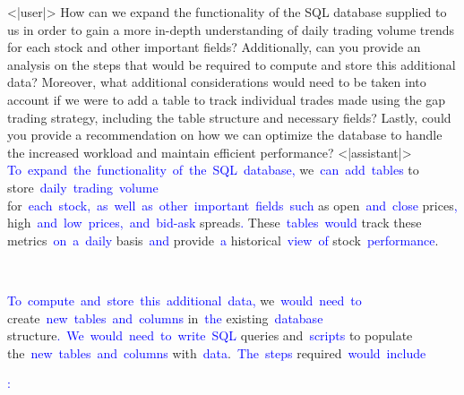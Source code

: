 \documentclass{article}
\begin{document}
\begin{tcolorbox}[colframe=black,colback=white]
<|user|>
How can we expand the functionality of the SQL database supplied to us in order to gain a more in-depth understanding of daily trading volume trends for each stock and other important fields? Additionally, can you provide an analysis on the steps that would be required to compute and store this additional data? Moreover, what additional considerations would need to be taken into account if we were to add a table to track individual trades made using the gap trading strategy, including the table structure and necessary fields? Lastly, could you provide a recommendation on how we can optimize the database to handle the increased workload and maintain efficient performance?
<|assistant|>
\textcolor{blue}{To}\textcolor{blue}{~expand}\textcolor{blue}{~the}\textcolor{blue}{~functionality}\textcolor{blue}{~of}\textcolor{blue}{~the}\textcolor{blue}{~SQL}\textcolor{blue}{~database}\textcolor{blue}{,} we\textcolor{blue}{~can}\textcolor{blue}{~add}\textcolor{blue}{~tables} to store\textcolor{blue}{~daily}\textcolor{blue}{~trading}\textcolor{blue}{~volume} for\textcolor{blue}{~each}\textcolor{blue}{~stock}\textcolor{blue}{,}\textcolor{blue}{~as}\textcolor{blue}{~well}\textcolor{blue}{~as}\textcolor{blue}{~other}\textcolor{blue}{~important}\textcolor{blue}{~fields}\textcolor{blue}{~such} as open\textcolor{blue}{~and}\textcolor{blue}{~close} prices\textcolor{blue}{,} high\textcolor{blue}{~and}\textcolor{blue}{~low}\textcolor{blue}{~prices}\textcolor{blue}{,}\textcolor{blue}{~and}\textcolor{blue}{~bid}\textcolor{blue}{-}\textcolor{blue}{ask} spreads\textcolor{blue}{.} These\textcolor{blue}{~tables}\textcolor{blue}{~would} track these metrics\textcolor{blue}{~on}\textcolor{blue}{~a}\textcolor{blue}{~daily} basis\textcolor{blue}{~and} provide\textcolor{blue}{~a} historical\textcolor{blue}{~view}\textcolor{blue}{~of} stock\textcolor{blue}{~performance}.\textcolor{blue}{~

}\textcolor{blue}{To}\textcolor{blue}{~compute}\textcolor{blue}{~and}\textcolor{blue}{~store}\textcolor{blue}{~this}\textcolor{blue}{~additional}\textcolor{blue}{~data}\textcolor{blue}{,} we\textcolor{blue}{~would}\textcolor{blue}{~need}\textcolor{blue}{~to} create\textcolor{blue}{~new}\textcolor{blue}{~tables}\textcolor{blue}{~and}\textcolor{blue}{~columns} in\textcolor{blue}{~the} existing\textcolor{blue}{~database} structure\textcolor{blue}{.}\textcolor{blue}{~We}\textcolor{blue}{~would}\textcolor{blue}{~need}\textcolor{blue}{~to}\textcolor{blue}{~write}\textcolor{blue}{~SQL} queries and\textcolor{blue}{~scripts} to populate the\textcolor{blue}{~new}\textcolor{blue}{~tables}\textcolor{blue}{~and}\textcolor{blue}{~columns} with\textcolor{blue}{~data}.\textcolor{blue}{~The}\textcolor{blue}{~steps} required\textcolor{blue}{~would}\textcolor{blue}{~include}\textcolor{blue}{:

}
\end{tcolorbox}
\end{document}
